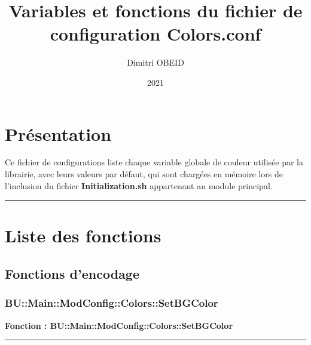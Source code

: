 \documentclass[a4paper,10pt]{article}
\title{\color{sec1}Variables et fonctions du fichier de configuration \color{path}Colors.conf}\color{text}
\author{Dimitri OBEID}
\date{2021}
\begin{document}
\maketitle
\newpage

\hypertarget{contents}{}
\tableofcontents
\newpage

\color{sec1}
\section{Présentation}\color{text}

\begin{justify}
    Ce fichier de configurations liste chaque variable globale de couleur utilisée par la librairie, avec leurs valeurs par défaut, qui sont chargées en mémoire lors de l'inclusion du fichier \textbf{\color{path}Initialization.sh} appartenant au module principal.
\end{justify}





\color{sec1}\par\noindent\rule{\textwidth}{0.4pt}\color{text}

\color{sec1}
\section{Liste des fonctions}\color{text}

\color{sec2}
\subsection{Fonctions d'encodage}\color{text}

\color{sec3}
\subsubsection{BU::Main::ModConfig::Colors::SetBGColor}\color{text}

\begin{justify}
    \textbf{Fonction : \color{func}BU::Main::ModConfig::Colors::SetBGColor}
\end{justify}


\par\noindent\rule{\textwidth}{0.4pt}
\end{document}
